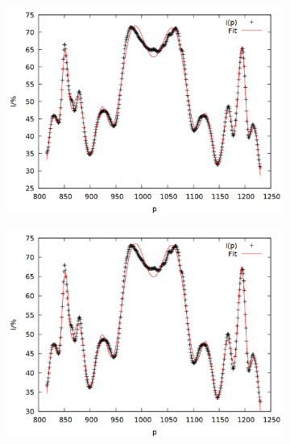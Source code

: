 \begin{figure}
\begin{subfigure}{0.45\textwidth}
\includegraphics[width=\textwidth]{data/zeeman/out_7_8.png}
\end{subfigure}
\begin{subfigure}{0.45\textwidth}
\includegraphics[width=\textwidth]{data/zeeman/out_8_1.png}
\end{subfigure}
\end{figure}

